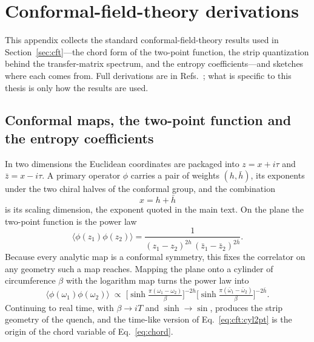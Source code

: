 \appendix

\FloatBarrier
\section{Conformal-field-theory derivations}
\label{app:cft}

This appendix collects the standard conformal-field-theory results used in Section~\ref{sec:cft}---the chord form of the two-point function, the strip quantization behind the transfer-matrix spectrum, and the entropy coefficients---and sketches where each comes from. Full derivations are in Refs.~\cite{calabrese_cardy2004,difrancesco1997}; what is specific to this thesis is only how the results are used.

\subsection{Conformal maps, the two-point function and the entropy coefficients}
\label{app:cft:maps}

In two dimensions the Euclidean coordinates are packaged into $z=x+i\tau$ and $\bar z=x-i\tau$. A primary operator $\phi$ carries a pair of weights $(h,\bar h)$, its exponents under the two chiral halves of the conformal group, and the combination
\begin{equation}
    x = h + \bar h
    \label{eq:cft:dim}
\end{equation}
is its scaling dimension, the exponent quoted in the main text. On the plane the two-point function is the power law
\begin{equation}
    \langle \phi(z_1)\phi(z_2)\rangle
      = \frac{1}{(z_1-z_2)^{2h}\,(\bar z_1-\bar z_2)^{2\bar h}}.
    \label{eq:cft:plane2pt}
\end{equation}
Because every analytic map is a conformal symmetry, this fixes the correlator on any geometry such a map reaches. Mapping the plane onto a cylinder of circumference $\beta$ with the logarithm map turns the power law into~\cite{calabrese_cardy2004,difrancesco1997}
\begin{equation}
    \langle\phi(\omega_1)\phi(\omega_2)\rangle \;\propto\;
      \Big[\sinh\tfrac{\pi(\omega_1-\omega_2)}{\beta}\Big]^{-2h}
      \Big[\sinh\tfrac{\pi(\bar\omega_1-\bar\omega_2)}{\beta}\Big]^{-2\bar h}.
    \label{eq:cft:cyl2pt}
\end{equation}
Continuing to real time, with $\beta\to iT$ and $\sinh\to\sin$, produces the strip geometry of the quench, and the time-like version of Eq.~\eqref{eq:cft:cyl2pt} is the origin of the chord variable of Eq.~\eqref{eq:chord}.

